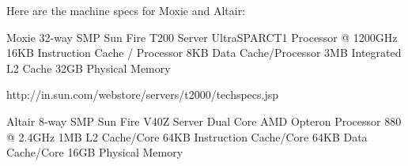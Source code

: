 Here are the machine specs for Moxie and Altair:

Moxie
	32-way SMP Sun Fire T200 Server
	UltraSPARCT1 Processor @ 1200GHz
	16KB Instruction Cache / Processor
	8KB Data Cache/Processor
	3MB Integrated L2 Cache
	32GB Physical Memory

	http://in.sun.com/webstore/servers/t2000/techspecs.jsp

Altair
	8-way SMP Sun Fire V40Z Server
	Dual Core AMD Opteron Processor 880 @ 2.4GHz
	1MB L2 Cache/Core
	64KB Instruction Cache/Core
	64KB Data Cache/Core
	16GB Physical Memory
